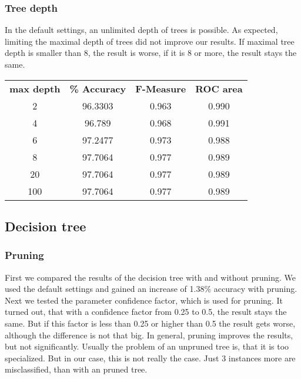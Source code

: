 \documentclass{article}
\begin{document}
\subsubsection{Tree depth}
 
In the default settings, an unlimited depth of trees is possible. As expected, limiting the maximal depth of trees did not improve our results. If maximal tree depth is smaller than 8, the result is worse, if it is 8 or more, the result stays the same.
 
\begin{center}
\begin{tabular}{ c | c | c | c }
\textbf{max depth} & \textbf{\% Accuracy} & \textbf{F-Measure} & \textbf{ROC area} \\
2 & 96.3303 & 0.963 & 0.990 \\
4 & 96.789 & 0.968 & 0.991 \\
6 & 97.2477 & 0.973 & 0.988 \\
8 & 97.7064 & 0.977 & 0.989 \\
20 & 97.7064 & 0.977 & 0.989 \\
100 & 97.7064 & 0.977 & 0.989 \\
\end{tabular}
\end{center}
 
\subsection{Decision tree}
 
\subsubsection{Pruning}
 
First we compared the results of the decision tree with and without pruning. We used the default settings and gained an increase of 1.38\% accuracy with pruning. Next we tested the parameter confidence factor, which is used for pruning. It turned out, that with a confidence factor from 0.25 to 0.5, the result stays the same. But if this factor is less than 0.25 or higher than 0.5 the result gets worse, although the difference is not that big. In general, pruning improves the results, but not significantly. Usually the problem of an unpruned tree is, that it is too specialized. But in our case, this is not really the case. Just 3 instances more are misclassified, than with an pruned tree. 
 
\end{document}
